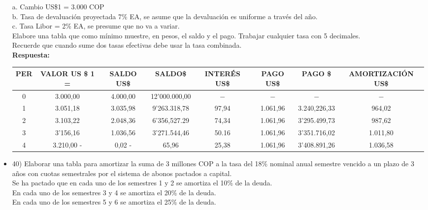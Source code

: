 \begin{itemize}
       a.	Cambio US\$1 = 3.000 COP \\
       b.	Tasa de devaluación proyectada 7\% EA, se asume que la devaluación es uniforme a través del año. \\
       c.	Tasa Libor = 2\% EA, se presume que no va a variar. \\

       Elabore una tabla que como mínimo muestre, en pesos, el saldo y el pago. Trabajar cualquier tasa con 5 decimales.\\
       Recuerde que cuando sume dos tasas efectivas debe usar la tasa    combinada.\\

       \textbf{ Respuesta:}
           \begin{center}
           \resizebox{\textwidth}{!}
           { 
       \begin{tabular}{| c | c | c | c | c | c | c | c  |}\hline
           \textbf{PER} & \textbf{VALOR US \$ 1 = }& \textbf{SALDO US\$} & \textbf{SALDO\$} & \textbf{INTERÉS US\$}  & \textbf{PAGO US\$} & \textbf{PAGO \$}  & \textbf{AMORTIZACIÓN US\$}   \\ \hline
        0 & 3.000,00 & 4.000,00 & 12'000.000,00 & $-$ & $-$ & $-$ & $-$  \\ \hline
        1 & 3.051,18 & 3.035,98 & 9'263.318,78 & 97,94 & 1.061,96 & 3.240,226,33 & 964,02  \\ \hline
        2 & 3.103,22 & 2.048,36 & 6'356,527.29 & 74,34 & 1.061,96 & 3'295.499,73 & 987,62  \\ \hline
        3 & 3'156,16 & 1.036,56 & 3'271.544,46 & 50.16 & 1.061,96 & 3'351.716,02 & 1.011,80  \\ \hline
        4 & 3.210,00 - & 0,02 - & 65,96 & 25,38 & 1.061,96 & 3'408.891,26 & 1.036,58  \\ \hline
        
        \end{tabular}}
           \end{center}
       \medskip

 \item 40)  Elaborar una tabla para amortizar la suma de 3 millones COP a la tasa del 18\% nominal anual semestre vencido a un plazo de 3 años con cuotas semestrales por el sistema de abonos pactados a capital.\\

       Se ha pactado que en cada uno de los semestres 1 y 2 se amortiza el 10\% de la deuda.\\
       En cada uno de los semestres 3 y 4 se amortiza el 20\% de la deuda. \\
       En cada uno de los semestres 5 y 6 se amortiza el 25\% de la deuda.\\


\end{itemize}
